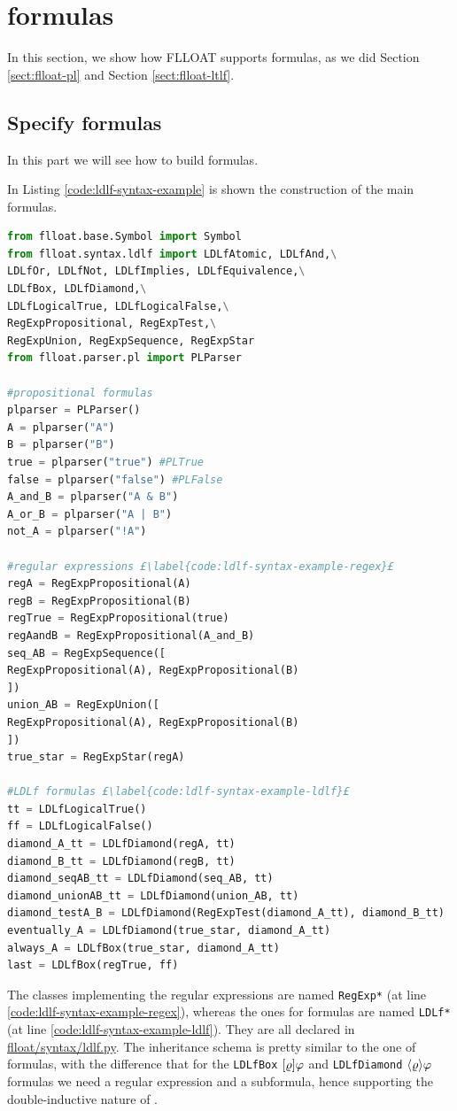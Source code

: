 \section{\LDLf formulas}\label{sect:flloat-ldlf}
In this section, we show how FLLOAT supports \LDLf formulas, as we did Section \ref{sect:flloat-pl} and Section \ref{sect:flloat-ltlf}.
\subsection{Specify \LDLf formulas}
In this part we will see how to build \LDLf formulas.

In Listing \ref{code:ldlf-syntax-example} is shown the construction of the main \LDLf formulas.

\begin{lstlisting}[language=Python, style=Python, escapechar = £, label={code:ldlf-syntax-example}, caption={Examples of \LDLf formulas}]
from flloat.base.Symbol import Symbol
from flloat.syntax.ldlf import LDLfAtomic, LDLfAnd,\
LDLfOr, LDLfNot, LDLfImplies, LDLfEquivalence,\
LDLfBox, LDLfDiamond,\
LDLfLogicalTrue, LDLfLogicalFalse,\
RegExpPropositional, RegExpTest,\
RegExpUnion, RegExpSequence, RegExpStar 
from flloat.parser.pl import PLParser

#propositional formulas
plparser = PLParser() 
A = plparser("A")
B = plparser("B")
true = plparser("true") #PLTrue
false = plparser("false") #PLFalse
A_and_B = plparser("A & B")
A_or_B = plparser("A | B")
not_A = plparser("!A")

#regular expressions £\label{code:ldlf-syntax-example-regex}£
regA = RegExpPropositional(A)
regB = RegExpPropositional(B)
regTrue = RegExpPropositional(true)
regAandB = RegExpPropositional(A_and_B)
seq_AB = RegExpSequence([
RegExpPropositional(A), RegExpPropositional(B)
])
union_AB = RegExpUnion([
RegExpPropositional(A), RegExpPropositional(B)
])
true_star = RegExpStar(regA)

#LDLf formulas £\label{code:ldlf-syntax-example-ldlf}£
tt = LDLfLogicalTrue()
ff = LDLfLogicalFalse()
diamond_A_tt = LDLfDiamond(regA, tt)
diamond_B_tt = LDLfDiamond(regB, tt)
diamond_seqAB_tt = LDLfDiamond(seq_AB, tt)
diamond_unionAB_tt = LDLfDiamond(union_AB, tt)
diamond_testA_B = LDLfDiamond(RegExpTest(diamond_A_tt), diamond_B_tt)
eventually_A = LDLfDiamond(true_star, diamond_A_tt)
always_A = LDLfBox(true_star, diamond_A_tt)
last = LDLfBox(regTrue, ff)
\end{lstlisting}
The classes implementing the regular expressions are named \texttt{RegExp*} (at line \ref{code:ldlf-syntax-example-regex}), whereas the ones for \LDLf formulas are named \texttt{LDLf*} (at line \ref{code:ldlf-syntax-example-ldlf}). They are all declared in \href{https://github.com/MarcoFavorito/flloat/blob/0.1.4/flloat/syntax/ldlf.py}{flloat/syntax/ldlf.py}. The inheritance schema is pretty similar to the one of \LTLf formulas, with the difference that for the \texttt{LDLfBox} $[\varrho]\varphi$ and \texttt{LDLfDiamond} $\langle \varrho \rangle\varphi$ formulas we need a regular expression and a \LDLf subformula, hence supporting the double-inductive nature of \LDLf.

